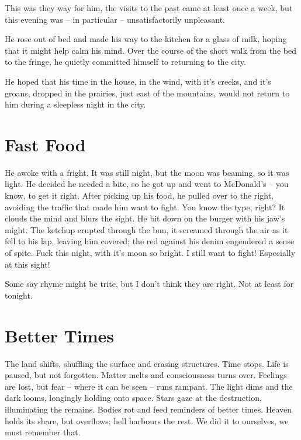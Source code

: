 \documentclass[fontsize=12pt,english]{scrreprt}
\begin{document}
This was they way for him, the visits to the past came at least once a
week, but this evening was -- in particular -- unsatisfactorily
unpleasant.

He rose out of bed and made his way to the kitchen for a glass of
milk, hoping that it might help calm his mind. Over the course of the
short walk from the bed to the fringe, he quietly committed himself to
returning to the city.

He hoped that his time in the house, in the wind, with it's creeks,
and it's groans, dropped in the prairies, just east of the mountains,
would not return to him during a sleepless night in the city.

\newpage

\section{Fast Food}

He awoke with a fright. It was still night, but the moon was beaming,
so it was light. He decided he needed a bite, so he got up and went to
McDonald's -- you know, to get it right.  After picking up his food,
he pulled over to the right, avoiding the traffic that made him want
to fight. You know the type, right? It clouds the mind and blurs the
sight. He bit down on the burger with his jaw’s might. The ketchup
erupted through the bun, it screamed through the air as it fell to his
lap, leaving him covered; the red against his denim engendered a sense
of spite. Fuck this night, with it’s moon so bright. I still want to
fight! Especially at this sight!

Some say rhyme might be trite, but I don’t think they are right. Not
at least for tonight.

\newpage

\section{Better Times}


The land shifts, shuffling the surface and erasing structures. Time
stops. Life is paused, but not forgotten. Matter melts and
consciousness turns over. Feelings are lost, but fear -- where it can
be seen -- runs rampant. The light dims and the dark looms, longingly
holding onto space. Stars gaze at the destruction, illuminating the
remains. Bodies rot and feed reminders of better times. Heaven holds
its share, but overflows; hell harbours the rest. We did it to
ourselves, we must remember that.
\end{document}
